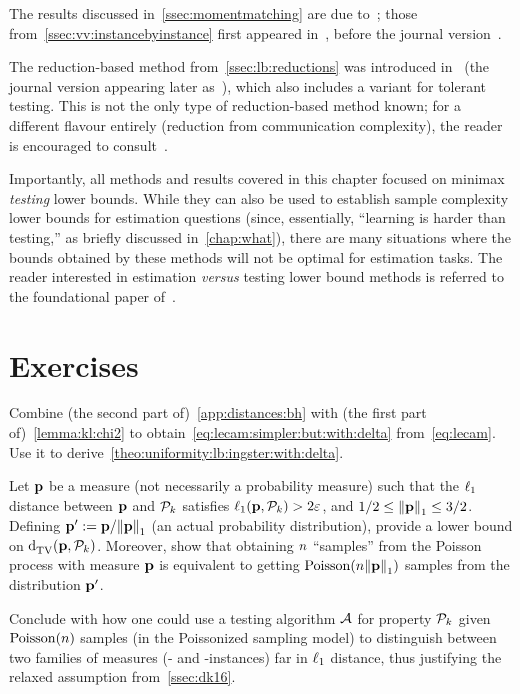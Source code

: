 The results discussed in~\cref{ssec:momentmatching} are due to~\citet{Valiant:11}; those from~\cref{ssec:vv:instancebyinstance} first appeared in~\citet{VV:14:FOCS}, before the journal version~\citep{ValiantV17}.

The reduction-based method from~\cref{ssec:lb:reductions} was introduced in~\citet{CDGR:16} (the journal version appearing later as~\citep{CDGR:17:journal}), which also includes a variant for tolerant testing. This is not the only type of reduction-based method known; for a different flavour entirely (reduction from communication complexity), the reader is encouraged to consult~\citet{BlaisCG19}.

Importantly, all methods and results covered in this chapter focused on minimax \emph{testing} lower bounds. While they can also be used to establish sample complexity lower bounds for estimation questions (since, essentially, ``learning is harder than testing,'' as briefly discussed in~\cref{chap:what}), there are many situations where the bounds obtained by these methods will not be optimal for estimation tasks. The reader interested in estimation \textit{versus} testing lower bound methods is referred to the foundational paper of~\citet{Yu97}.

\section{Exercises}

\begin{question}\label{exo:deriving:dep:delta:lb}
Combine (the second part of)~\cref{app:distances:bh} with (the first part of)~\cref{lemma:kl:chi2} to obtain~\cref{eq:lecam:simpler:but:with:delta} from~\cref{eq:lecam}. Use it to derive~\cref{theo:uniformity:lb:ingster:with:delta}.
\end{question}

\begin{question}\label{exo:notrealproba:lb}
Let $\p$ be a measure (not necessarily a probability measure) such that the $\lp[1]$ distance between $\p$ and $\property_\ab$ satisfies $\lp[1](\p,\property_\ab)>2\dst$, and $1/2\leq \normone{\p} \leq 3/2$. Defining $\p' \eqdef \p/\normone{\p}$ (an actual probability distribution), provide a lower bound on $\totalvardist{\p}{\property_\ab}$. Moreover, show that obtaining $\ns$ ``samples'' from the Poisson process with measure $\p$ is equivalent to getting $\poisson{\ns\normone{\p}}$ samples from the distribution $\p'$.

Conclude with how one could use a testing algorithm $\Algo$ for property $\property_\ab$ given $\poisson{\ns}$ samples (\ie in the Poissonized sampling model) to distinguish between two families of measures (\yes- and \no-instances) far in $\lp[1]$ distance, thus justifying the relaxed assumption from~\cref{ssec:dk16}.
\end{question}

